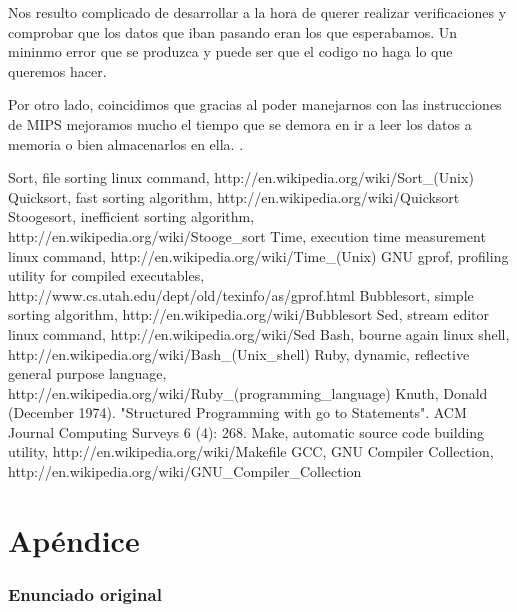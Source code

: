 \documentclass[a4paper,11pt]{article}
\begin{document}
Nos resulto complicado de desarrollar a la hora de querer realizar verificaciones
y comprobar que los datos que iban pasando eran los que esperabamos.
Un mininmo error que se produzca y puede ser que el codigo no haga lo que
queremos hacer.

Por otro lado, coincidimos que gracias al poder manejarnos con las instrucciones
de MIPS mejoramos mucho el tiempo que se demora en ir a leer los datos a memoria
o bien almacenarlos en ella.
\cite{OPT}.

\begin{thebibliography}{99}

 Sort, file sorting linux command, http://en.wikipedia.org/wiki/Sort\_(Unix)
 Quicksort, fast sorting algorithm, http://en.wikipedia.org/wiki/Quicksort
 Stoogesort, inefficient sorting algorithm, http://en.wikipedia.org/wiki/Stooge\_sort
 Time, execution time measurement linux command, http://en.wikipedia.org/wiki/Time\_(Unix)
 GNU gprof, profiling utility for compiled executables, http://www.cs.utah.edu/dept/old/texinfo/as/gprof.html
 Bubblesort, simple sorting algorithm, http://en.wikipedia.org/wiki/Bubblesort
 Sed, stream editor linux command, http://en.wikipedia.org/wiki/Sed
 Bash, bourne again linux shell, http://en.wikipedia.org/wiki/Bash\_(Unix\_shell)
 Ruby, dynamic, reflective general purpose language, http://en.wikipedia.org/wiki/Ruby\_(programming\_language)
 Knuth, Donald (December 1974). "Structured Programming with go to Statements". ACM Journal Computing Surveys 6 (4): 268.
 Make, automatic source code building utility, http://en.wikipedia.org/wiki/Makefile
 GCC, GNU Compiler Collection, http://en.wikipedia.org/wiki/GNU\_Compiler\_Collection

\end{thebibliography}

\clearpage

\part{Apéndice}
\appendix

\section{Enunciado original}\label{sec:enunciado}

\end{document}
